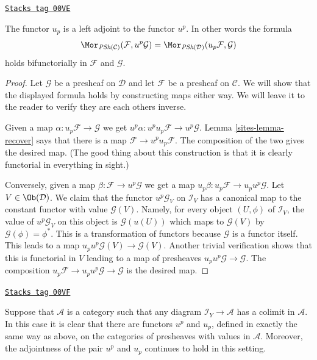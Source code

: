 \begin{lemma}[Adjoints u]
\label{sites-lemma-adjoints-u}
\href{https://stacks.math.columbia.edu/tag/00VE}{\texttt{Stacks tag 00VE}}

The functor $u_p$ is a left adjoint to the functor $u^p$.
In other words the formula
$$
\Mor_{\textit{PSh}(\mathcal{C})}(\mathcal{F}, u^p\mathcal{G})
=
\Mor_{\textit{PSh}(\mathcal{D})}(u_p\mathcal{F}, \mathcal{G})
$$
holds bifunctorially in $\mathcal{F}$ and $\mathcal{G}$.
\end{lemma}

\begin{proof}

Let $\mathcal{G}$ be a presheaf on $\mathcal{D}$ and let
$\mathcal{F}$ be a presheaf on $\mathcal{C}$.
We will show that the displayed formula holds
by constructing maps either way. We will leave
it to the reader to verify they are each others inverse.

\medskip\noindent
Given a map $\alpha : u_p \mathcal{F} \to \mathcal{G}$
we get $u^p\alpha : u^p u_p \mathcal{F} \to u^p \mathcal{G}$.
Lemma \ref{sites-lemma-recover} says that there is a
map $\mathcal{F} \to u^p u_p \mathcal{F}$. The composition
of the two gives the desired map. (The good thing about this construction
is that it is clearly functorial in everything in sight.)

\medskip\noindent
Conversely, given a map $\beta : \mathcal{F} \to u^p\mathcal{G}$
we get a map $u_p\beta : u_p\mathcal{F} \to u_p u^p\mathcal{G}$.
Let $V \in \Ob(\mathcal{D})$.
We claim that the functor $u^p\mathcal{G}_V$ on $\mathcal{I}_V$
has a canonical map to the constant functor with value $\mathcal{G}(V)$.
Namely, for every object $(U, \phi)$ of $\mathcal{I}_V$,
the value of $u^p\mathcal{G}_V$ on this object is $\mathcal{G}(u(U))$
which maps to $\mathcal{G}(V)$ by $\mathcal{G}(\phi) = \phi^*$.
This is a transformation of functors because $\mathcal{G}$ is a functor
itself. This leads to a map $u_p u^p \mathcal{G}(V) \to \mathcal{G}(V)$.
Another trivial verification shows that this is functorial in $V$
leading to a map of presheaves $u_p u^p \mathcal{G} \to \mathcal{G}$.
The composition $u_p\mathcal{F} \to u_p u^p\mathcal{G} \to
\mathcal{G}$ is the desired map.
\end{proof}

\begin{remark}
\label{sites-remark-functoriality-presheaves-values}
\href{https://stacks.math.columbia.edu/tag/00VF}{\texttt{Stacks tag 00VF}}

Suppose that $\mathcal{A}$ is a category such that
any diagram $\mathcal{I}_Y \to \mathcal{A}$ has a
colimit in $\mathcal{A}$. In this case it is clear
that there are functors $u^p$ and $u_p$, defined in
exactly the same way as above, on the categories
of presheaves with values in $\mathcal{A}$.
Moreover, the adjointness of the pair
$u^p$ and $u_p$ continues to hold in this setting.
\end{remark}

